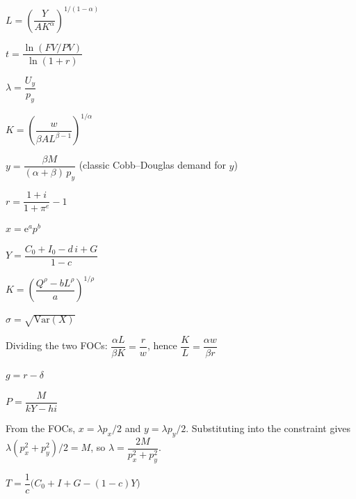 \begin{solutions}
  \item $L = \left( \dfrac{Y}{A K^{\alpha}} \right)^{1 / (1 - \alpha)}$
  \item $t = \dfrac{\ln(FV / PV)}{\ln(1 + r)}$
  \item $\lambda = \dfrac{U_y}{p_y}$
  \item $K = \left( \dfrac{w}{\beta A L^{\beta - 1}} \right)^{1/\alpha}$
  \item $y = \dfrac{\beta M}{(\alpha + \beta) \, p_y}$
        \;(classic Cobb--Douglas demand for $y$)
  \item $r = \dfrac{1 + i}{1 + \pi^e} - 1$
  \item $x = \mathrm{e}^{a} p^{b}$
  \item $Y = \dfrac{C_0 + I_0 - d \, i + G}{1 - c}$
  \item $K = \left( \dfrac{Q^{\rho} - b L^{\rho}}{a} \right)^{1/\rho}$
  \item $\sigma = \sqrt{\text{Var}(X)}$
  \item Dividing the two FOCs:
        $\dfrac{\alpha L}{\beta K} = \dfrac{r}{w}$, hence
        $\dfrac{K}{L} = \dfrac{\alpha w}{\beta r}$
  \item $g = r - \delta$
  \item $P = \dfrac{M}{k Y - h i}$
  \item From the FOCs, $x = \lambda p_x / 2$ and $y = \lambda p_y / 2$.
        Substituting into the constraint gives
        $\lambda (p_x^2 + p_y^2) / 2 = M$, so
        $\lambda = \dfrac{2 M}{p_x^2 + p_y^2}$.
  \item $T = \dfrac{1}{c} \bigl(C_0 + I + G - (1 - c) Y\bigr)$
\end{solutions}

